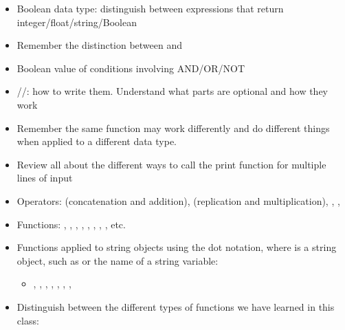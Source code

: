 \documentclass[letterpaper,10pt,english]{sphinxmanual}
\begin{document}
\begin{itemize}
\item {} 
Boolean data type: distinguish between expressions that return
integer/float/string/Boolean

\item {} 
Remember the distinction between \sphinxcode{\sphinxupquote{=}} and \sphinxcode{\sphinxupquote{==}}

\item {} 
Boolean value of conditions involving AND/OR/NOT

\item {} 
//:  how to write them. Understand what parts
are optional and how they work

\item {} 
Remember the same function may work differently and do different
things when applied to a different data type.

\item {} 
Review all about the different ways to call the print function for
multiple lines of input

\item {} 
Operators: \sphinxcode{\sphinxupquote{+}} (concatenation and addition), \sphinxcode{\sphinxupquote{*}} (replication
and multiplication), \sphinxcode{\sphinxupquote{/}}, \sphinxcode{\sphinxupquote{\%}}, \sphinxcode{\sphinxupquote{**}}

\item {} 
Functions:  , , ,
, , , ,
,  etc.

\item {} 
Functions applied to string objects using the dot notation, where
 is a string object, such as  or the name of a
string variable:
\begin{itemize}
\item {} 
, , ,
, ,
, , 

\end{itemize}

\item {} 
Distinguish between the different types of functions we have
learned in this class:

\end{itemize}
\end{document}
